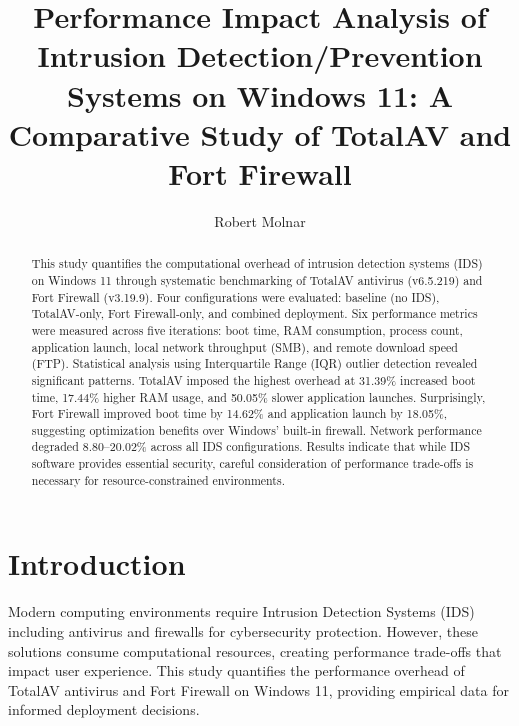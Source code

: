 \documentclass[runningheads,a4paper,english]{llncs}[2022/01/12]
\begin{document}
\title{Performance Impact Analysis of Intrusion Detection/Prevention Systems on Windows 11: A Comparative Study of TotalAV and Fort Firewall}


\author{Robert Molnar}



\maketitle

\begin{abstract}
This study quantifies the computational overhead of intrusion detection systems (IDS) on Windows 11 through systematic benchmarking of TotalAV antivirus (v6.5.219) and Fort Firewall (v3.19.9). Four configurations were evaluated: baseline (no IDS), TotalAV-only, Fort Firewall-only, and combined deployment. Six performance metrics were measured across five iterations: boot time, RAM consumption, process count, application launch, local network throughput (SMB), and remote download speed (FTP). Statistical analysis using Interquartile Range (IQR) outlier detection revealed significant patterns. TotalAV imposed the highest overhead at 31.39\% increased boot time, 17.44\% higher RAM usage, and 50.05\% slower application launches. Surprisingly, Fort Firewall improved boot time by 14.62\% and application launch by 18.05\%, suggesting optimization benefits over Windows' built-in firewall. Network performance degraded 8.80--20.02\% across all IDS configurations. Results indicate that while IDS software provides essential security, careful consideration of performance trade-offs is necessary for resource-constrained environments.

\end{abstract}

\section{Introduction}
\label{sec:introduction}

Modern computing environments require Intrusion Detection Systems (IDS) including antivirus and firewalls for cybersecurity protection. However, these solutions consume computational resources, creating performance trade-offs that impact user experience. This study quantifies the performance overhead of TotalAV antivirus and Fort Firewall on Windows 11, providing empirical data for informed deployment decisions.
\end{document}
